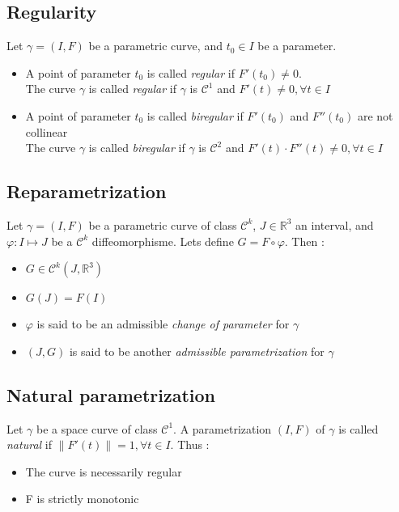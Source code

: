 \subsection{Regularity}
Let $\gamma=(I,F)$ be a parametric curve, and $t_0 \in I$ be a parameter.
\begin{itemize}
	\item A point of parameter $t_0$ is called \emph{regular} if $F'(t_0) \neq 0$.
	\\The curve $\gamma$ is called \emph{regular} if $\gamma$ is $\mathcal{C}^{1}$ and $F'(t) \neq 0, \forall t \in I$
	\item A point of parameter $t_0$ is called \emph{biregular} if $F'(t_0)$ and $F''(t_0)$ are not collinear
	\\The curve $\gamma$ is called \emph{biregular} if $\gamma$ is $\mathcal{C}^{2}$ and  $F'(t)\cdot    F''(t) \neq 0, \forall t \in I$
\end{itemize}

\subsection{Reparametrization}
Let $\gamma=(I,F)$ be a parametric curve of class ${\mathcal{C}}^{k}$, $J \in {\mathbb{R}}^{3}$ an interval, and $\varphi\colon I\mapsto J$ be a ${\mathcal{C}}^{k}$ diffeomorphisme. Lets define $G=F\circ\varphi$. Then :
\begin{itemize}
	\item $G\in{\mathcal{C}}^{k}(J,{\mathbb{R}}^3)$
	\item $G(J)=F(I)$
	\item $\varphi$ is said to be an admissible \emph{change of parameter} for $\gamma$
	\item  $(J,G)$ is said to be another \emph{admissible parametrization} for $\gamma$
\end{itemize}

\subsection{Natural parametrization}
Let $\gamma$ be a space curve of class ${\mathcal{C}}^{1}$. A parametrization $(I,F)$ of $\gamma$ is called \emph{natural} if $\|F'(t)\| = 1, \forall t \in I$. Thus :
\begin{itemize}
	\item The curve is necessarily regular
	\item F is strictly monotonic
\end{itemize}

